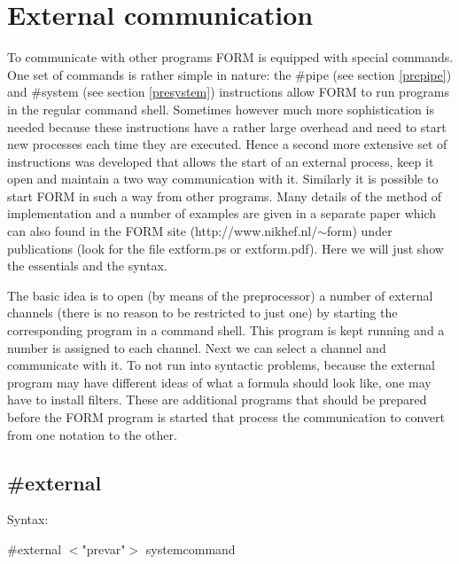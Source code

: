 \chapter{External communication}
\label{externalcommunication}

To communicate with other programs FORM is 
equipped with special commands. One set of commands is rather simple in 
nature: the \#pipe (see section \ref{prepipe}) and 
\#system (see section \ref{presystem}) instructions allow 
FORM to run programs in the regular command 
shell. Sometimes however much more sophistication is needed 
because these instructions have a rather large overhead and need to start 
new processes each time they are executed. Hence a second more extensive 
set of instructions was developed that allows the start of an external 
process, keep it open and maintain a two way 
communication with it. Similarly it is 
possible to start FORM in such a way from other programs. Many details of 
the method of implementation and a number of examples are given in a 
separate paper which can also found in the FORM site 
(http://www.nikhef.nl/$\sim$form) under publications (look for the file 
extform.ps or extform.pdf). Here we 
will just show the essentials and the syntax.

The basic idea is to open (by means of the preprocessor) a number of 
external channels (there is no reason to be 
restricted to just one) by starting the corresponding program in a command 
shell. This program is kept running and a number is assigned to each 
channel. Next we can select a channel and communicate with it. To not run 
into syntactic problems, because the external program may have different 
ideas of what a formula should look like, one may have to install 
filters. These are additional programs that should be 
prepared before the FORM program is started that process the communication 
to convert from one notation to the other.


\section{\#external}
\label{external}

\noindent Syntax:

\#external $<$"prevar"$>$ systemcommand

